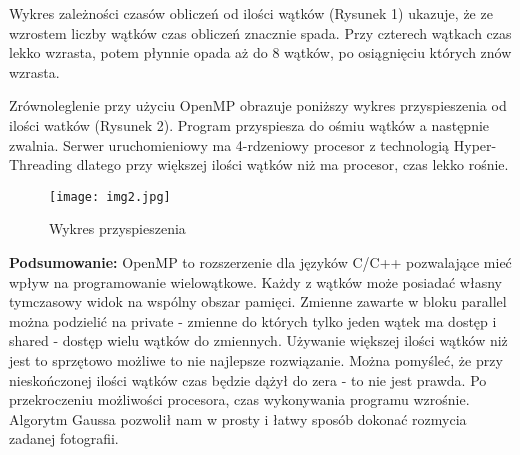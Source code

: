 \documentclass[a4paper,12pt]{article}
\begin{document}
Wykres zależności czasów obliczeń od ilości wątków (Rysunek 1) ukazuje, że ze wzrostem liczby wątków czas obliczeń znacznie spada. Przy czterech wątkach czas lekko wzrasta, potem płynnie opada aż do 8 wątków, po osiągnięciu których znów wzrasta. 

Zrównoleglenie przy użyciu OpenMP obrazuje poniższy wykres przyspieszenia od ilości watków (Rysunek 2). Program przyspiesza do  ośmiu wątków a następnie zwalnia. Serwer uruchomieniowy ma 4-rdzeniowy procesor z technologią Hyper-Threading dlatego przy większej ilości wątków niż ma procesor, czas lekko rośnie.

\begin{wrapfigure}{r}{0.5\textwidth}
	\vspace{-40pt}
	\begin{center}
		\texttt{[image: img2.jpg]}
	\end{center}
	\vspace{-20pt}
	\caption{Wykres przyspieszenia}
	\vspace{35pt}
\end{wrapfigure}


\textbf{Podsumowanie:} OpenMP to rozszerzenie dla języków C/C++ pozwalające mieć wpływ na programowanie wielowątkowe. Każdy z wątków może posiadać własny tymczasowy widok na wspólny obszar pamięci. Zmienne zawarte w bloku parallel można podzielić na private - zmienne do których tylko jeden wątek ma dostęp i shared - dostęp wielu wątków do zmiennych. Używanie większej ilości wątków niż jest to sprzętowo możliwe to nie najlepsze rozwiązanie. Można pomyśleć, że przy nieskończonej ilości wątków czas będzie dążył do zera - to nie jest prawda. Po przekroczeniu możliwości procesora, czas wykonywania programu wzrośnie. Algorytm Gaussa pozwolił nam w prosty i łatwy sposób dokonać rozmycia zadanej fotografii.
\end{document}
